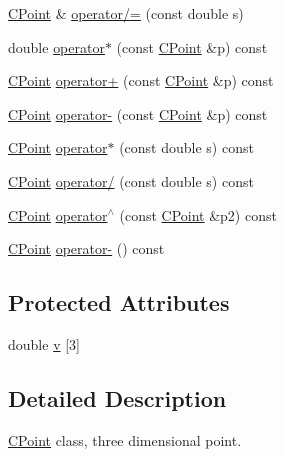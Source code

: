 \begin{DoxyCompactItemize}
\item 
\hyperlink{class_mesh_lib_1_1_c_point}{C\+Point} \& \hyperlink{class_mesh_lib_1_1_c_point_a17cc24c674f62fa9c9e2ff521229e64b}{operator/=} (const double s)
\item 
double \hyperlink{class_mesh_lib_1_1_c_point_a83d9eefdfa825918e34e473aade76165}{operator$\ast$} (const \hyperlink{class_mesh_lib_1_1_c_point}{C\+Point} \&p) const 
\item 
\hyperlink{class_mesh_lib_1_1_c_point}{C\+Point} \hyperlink{class_mesh_lib_1_1_c_point_a407873256e1bb467de5086e534f1bb72}{operator+} (const \hyperlink{class_mesh_lib_1_1_c_point}{C\+Point} \&p) const 
\item 
\hyperlink{class_mesh_lib_1_1_c_point}{C\+Point} \hyperlink{class_mesh_lib_1_1_c_point_ab035c15771d3a659a58ff34a79300587}{operator-\/} (const \hyperlink{class_mesh_lib_1_1_c_point}{C\+Point} \&p) const 
\item 
\hyperlink{class_mesh_lib_1_1_c_point}{C\+Point} \hyperlink{class_mesh_lib_1_1_c_point_a515a0754db8513a1a64ff278f540406d}{operator$\ast$} (const double s) const 
\item 
\hyperlink{class_mesh_lib_1_1_c_point}{C\+Point} \hyperlink{class_mesh_lib_1_1_c_point_a9a9d7522d2dcd89a0bfdc5a0d6ddd5f2}{operator/} (const double s) const 
\item 
\hyperlink{class_mesh_lib_1_1_c_point}{C\+Point} \hyperlink{class_mesh_lib_1_1_c_point_adf596ee4ed723ce49729acf4fb9e8ee0}{operator$^\wedge$} (const \hyperlink{class_mesh_lib_1_1_c_point}{C\+Point} \&p2) const 
\item 
\hyperlink{class_mesh_lib_1_1_c_point}{C\+Point} \hyperlink{class_mesh_lib_1_1_c_point_aa96a54b74045e251e06e068ac734534f}{operator-\/} () const 
\end{DoxyCompactItemize}
\subsection*{Protected Attributes}
\begin{DoxyCompactItemize}
\item 
double \hyperlink{class_mesh_lib_1_1_c_point_aabfccf1912d5b44eab72f6f2e5bf3b12}{v} \mbox{[}3\mbox{]}
\end{DoxyCompactItemize}


\subsection{Detailed Description}
\hyperlink{class_mesh_lib_1_1_c_point}{C\+Point} class, three dimensional point. 

